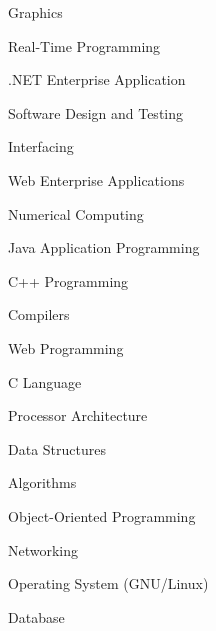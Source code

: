 

\begin{cvparagraph}

\begin{enumerate*}[label=\bullet\hspace{2pt}]
    \item Graphics
    \item Real-Time Programming
    \item .NET Enterprise Application
    \item Software Design and Testing
    \item Interfacing
    \item Web Enterprise Applications
    \item Numerical Computing
    \item Java Application Programming
    \item C++ Programming
    \item Compilers
    \item Web Programming
    \item C Language
    \item Processor Architecture
    \item Data Structures
    \item Algorithms
    \item Object-Oriented Programming
    \item Networking
    \item Operating System (GNU/Linux)
    \item Database
\end{enumerate*}

\end{cvparagraph}
